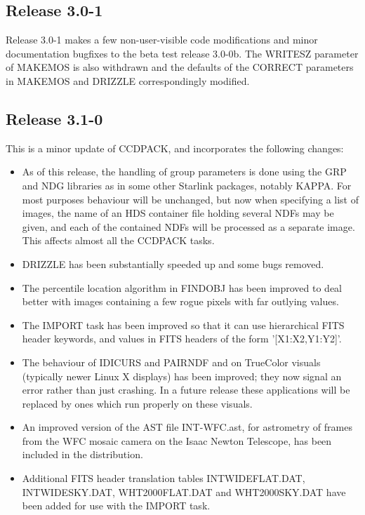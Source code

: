 \documentclass[twoside,11pt]{article}
\newcommand{\htmlref}[2]{#1}
\newcommand{\xref}[3]{#1}
\renewcommand{\_}{\texttt{\symbol{95}}}
\newcommand{\xroutine}[1]{\htmlref{{\sc #1}}{#1}}
\begin{document}
\subsection{Release 3.0-1}

  Release 3.0-1 makes a few non-user-visible code modifications and minor
  documentation bugfixes to the beta test release 3.0-0b.  The WRITESZ
  parameter of \xroutine{MAKEMOS} is also withdrawn and the defaults of
  the CORRECT parameters in \xroutine{MAKEMOS} and \xroutine{DRIZZLE} 
  correspondingly modified.

\subsection{Release 3.1-0}

  This is a minor update of CCDPACK, and incorporates the following changes:
\begin{itemize}
\item
  As of this release, the handling of group parameters is done using
  the GRP and NDG libraries as in some other Starlink packages, notably 
  \xref{KAPPA}{sun95}{}.  
  For most purposes behaviour will be unchanged, 
  but now when specifying a list of images, the name of an HDS container
  file holding several NDFs may be given, and each of the contained NDFs 
  will be processed as a separate image.  This affects almost all the
  CCDPACK tasks.
\item
  \xroutine{DRIZZLE} has been substantially speeded up and some bugs removed.
\item
  The percentile location algorithm in \xroutine{FINDOBJ} has been improved to 
  deal better with images containing a few rogue pixels with far 
  outlying values.
\item
  The \xroutine{IMPORT} task has been improved so that it can use hierarchical
  FITS header keywords, and values in FITS headers of the form 
  '[X1:X2,Y1:Y2]'.
\item
  The behaviour of \xroutine{IDICURS} and \xroutine{PAIRNDF} and 
  on TrueColor visuals (typically newer Linux X displays)
  has been improved; they now signal an error rather than just crashing.
  In a future release these applications will be replaced by ones which
  run properly on these visuals.
\item
  An improved version of the AST file INT-WFC.ast, for astrometry of 
  frames from the WFC mosaic camera on the Isaac Newton Telescope,
  has been included in the distribution.
\item
  Additional FITS header translation tables INTWIDEFLAT.DAT, 
  INTWIDESKY.DAT, WHT2000FLAT.DAT and WHT2000SKY.DAT have been added
  for use with the IMPORT task.
\end{itemize}
\end{document}
